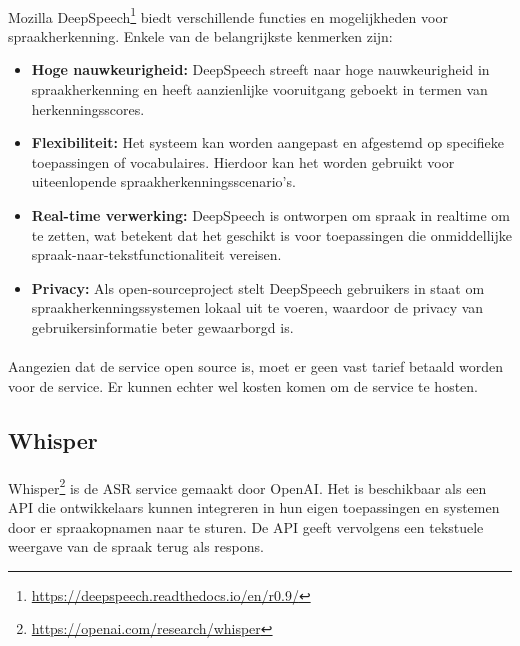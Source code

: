 \paragraph{}
Mozilla DeepSpeech\footnote{\href{https://deepspeech.readthedocs.io/en/r0.9/}{https://deepspeech.readthedocs.io/en/r0.9/}} biedt verschillende functies en mogelijkheden voor spraakherkenning. Enkele van de belangrijkste kenmerken zijn:

\begin{itemize}
    \item \textbf{Hoge nauwkeurigheid:} DeepSpeech streeft naar hoge nauwkeurigheid in spraakherkenning en heeft aanzienlijke vooruitgang geboekt in termen van herkenningsscores.

    \item \textbf{Flexibiliteit:} Het systeem kan worden aangepast en afgestemd op specifieke toepassingen of vocabulaires. Hierdoor kan het worden gebruikt voor uiteenlopende spraakherkenningsscenario's.

    \item \textbf{Real-time verwerking:} DeepSpeech is ontworpen om spraak in realtime om te zetten, wat betekent dat het geschikt is voor toepassingen die onmiddellijke spraak-naar-tekstfunctionaliteit vereisen.

    \item \textbf{Privacy:} Als open-sourceproject stelt DeepSpeech gebruikers in staat om spraakherkenningssystemen lokaal uit te voeren, waardoor de privacy van gebruikersinformatie beter gewaarborgd is.
\end{itemize}

\paragraph{}
Aangezien dat de service open source is, moet er geen vast tarief betaald worden voor de service. Er kunnen echter wel kosten komen om de service te hosten.

\subsection{Whisper}%

\paragraph{}
Whisper\footnote{\href{https://openai.com/research/whisper}{https://openai.com/research/whisper}} is de ASR service gemaakt door OpenAI. Het is beschikbaar als een API die ontwikkelaars kunnen integreren in hun eigen toepassingen en systemen door er spraakopnamen naar te sturen. De API geeft vervolgens een tekstuele weergave van de spraak terug als respons.

